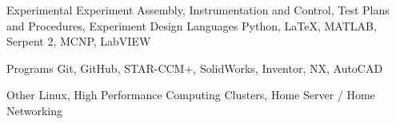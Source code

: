
\begin{cvskills}
  \cvskill
    {Experimental}
    {Experiment Assembly, Instrumentation and Control, Test Plans and Procedures, Experiment Design}
  \cvskill
    {Languages} %
    {Python, \LaTeX, MATLAB, Serpent 2, MCNP, LabVIEW} %

  \cvskill
    {Programs} %
    {Git, GitHub, STAR-CCM+, SolidWorks, Inventor, NX, AutoCAD} %
    
  \cvskill
    {Other} %
    {Linux, High Performance Computing Clusters, Home Server / Home Networking} %
\end{cvskills}
